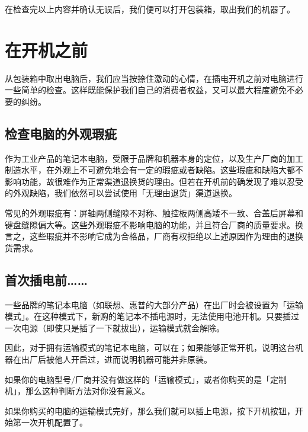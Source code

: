 在检查完以上内容并确认无误后，我们便可以打开包装箱，取出我们的机器了。

\section{在开机之前}

从包装箱中取出电脑后，我们应当按捺住激动的心情，在插电开机之前对电脑进行一些简单的检查。这样既能保护我们自己的消费者权益，又可以最大程度避免不必要的纠纷。

\subsection{检查电脑的外观瑕疵}

作为工业产品的笔记本电脑，受限于品牌和机器本身的定位，以及生产厂商的加工制造水平，在外观上不可避免地会有一定的瑕疵或者缺陷。这些瑕疵和缺陷大都不影响功能，故很难作为正常渠道退换货的理由。但若在开机前的确发现了难以忍受的外观缺陷，我们依然可以尝试使用「无理由退货」渠道退换。

常见的外观瑕疵有：屏轴两侧缝隙不对称、触控板两侧高矮不一致、合盖后屏幕和键盘缝隙偏大等。这些外观瑕疵不影响电脑的功能，并且符合厂商的质量要求。换言之，这些瑕疵并不影响它成为合格品，厂商有权拒绝以上述原因作为理由的退换货需求。

\subsection{首次插电前……}

一些品牌的笔记本电脑（如联想、惠普的大部分产品）在出厂时会被设置为「运输模式」。在这种模式下，新购的笔记本不插电源时，无法使用电池开机。只要插过一次电源（即使只是插了一下就拔出），运输模式就会解除。

因此，对于拥有运输模式的笔记本电脑，可以在；如果能够正常开机，说明这台机器在出厂后被他人开启过，进而说明机器可能并非原装。

\begin{note}
  如果你的电脑型号/厂商并没有做这样的「运输模式」，或者你购买的是「定制机」，那么这种判断方法对你没有意义。
\end{note}

如果你购买的电脑的运输模式完好，那么我们就可以插上电源，按下开机按钮，开始第一次开机配置了。

